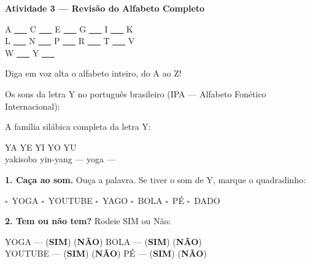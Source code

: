 \begin{consolidacao}
\textbf{Atividade 3 --- Revis\~a{}o do Alfabeto Completo}


\begin{center}
A \quad \underline{~~~} \quad C \quad \underline{~~~} \quad E \quad \underline{~~~} \quad G \quad \underline{~~~} \quad I \quad \underline{~~~} \quad K \\[0.5em]
L \quad \underline{~~~} \quad N \quad \underline{~~~} \quad P \quad \underline{~~~} \quad R \quad \underline{~~~} \quad T \quad \underline{~~~} \quad V \\[0.5em]
W \quad \underline{~~~} \quad Y \quad \underline{~~~}
\end{center}
Diga em voz alta o alfabeto inteiro, do A ao Z!

\end{consolidacao}


\begin{sonsdaletra}
Os sons da letra Y no portugu\^es{} brasileiro (IPA --- Alfabeto Fon\'etico Internacional):

\end{sonsdaletra}


\begin{familiasilabica}
A fam\'ilia sil\'abica completa da letra Y:

\begin{center}
YA \quad YE \quad YI \quad YO \quad YU \\[0.5em] yakisoba \quad yin-yang \quad --- \quad yoga \quad ---
\end{center}
\end{familiasilabica}


\begin{somletra}
\textbf{1. Ca\c{c}a ao som.} Ou\c{c}a a palavra. Se tiver o som de Y, marque o quadradinho:
\begin{center}
$\square$~YOGA \quad $\square$~YOUTUBE \quad $\square$~YAGO \quad $\square$~BOLA \quad $\square$~P\'E \quad $\square$~DADO
\end{center}

\textbf{2. Tem ou n\~ao{} tem?} Rodeie SIM ou N\~ao:
\begin{center}
YOGA --- (\textbf{SIM}) (\textbf{N\~AO}) \quad BOLA --- (\textbf{SIM}) (\textbf{N\~AO}) \\ YOUTUBE --- (\textbf{SIM}) (\textbf{N\~AO}) \quad P\'E --- (\textbf{SIM}) (\textbf{N\~AO})
\end{center}
\end{somletra}

